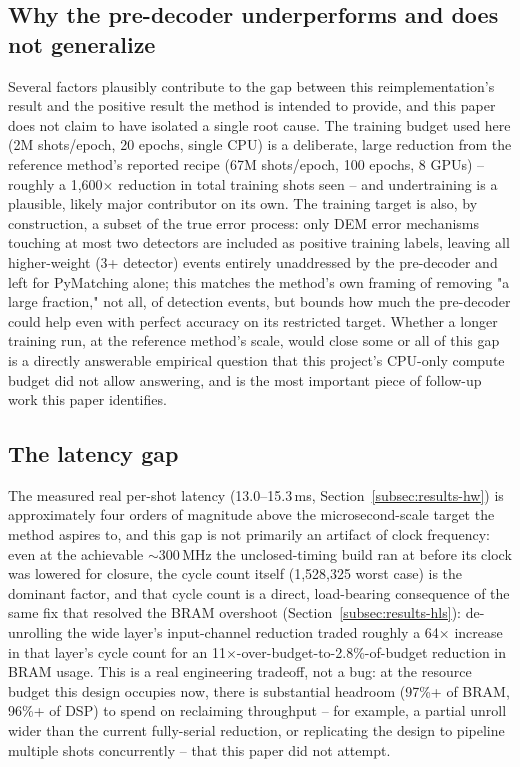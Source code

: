 \documentclass[conference]{IEEEtran}
\begin{document}
\subsection{Why the pre-decoder underperforms and does not generalize}
\label{subsec:discussion-why}
Several factors plausibly contribute to the gap between this reimplementation's result and the positive result the method is intended to provide, and this paper does not claim to have isolated a single root cause. The training budget used here (2M shots/epoch, 20 epochs, single CPU) is a deliberate, large reduction from the reference method's reported recipe (67M shots/epoch, 100 epochs, 8 GPUs) -- roughly a 1{,}600\(\times\) reduction in total training shots seen -- and undertraining is a plausible, likely major contributor on its own. The training target is also, by construction, a subset of the true error process: only DEM error mechanisms touching at most two detectors are included as positive training labels, leaving all higher-weight (3+ detector) events entirely unaddressed by the pre-decoder and left for PyMatching alone; this matches the method's own framing of removing "a large fraction," not all, of detection events, but bounds how much the pre-decoder could help even with perfect accuracy on its restricted target. Whether a longer training run, at the reference method's scale, would close some or all of this gap is a directly answerable empirical question that this project's CPU-only compute budget did not allow answering, and is the most important piece of follow-up work this paper identifies.

\subsection{The latency gap}
\label{subsec:discussion-latency}
The measured real per-shot latency (13.0--15.3\,ms, Section~\ref{subsec:results-hw}) is approximately four orders of magnitude above the microsecond-scale target the method aspires to, and this gap is not primarily an artifact of clock frequency: even at the achievable \(\sim\)300\,MHz the unclosed-timing build ran at before its clock was lowered for closure, the cycle count itself (1{,}528{,}325 worst case) is the dominant factor, and that cycle count is a direct, load-bearing consequence of the same fix that resolved the BRAM overshoot (Section~\ref{subsec:results-hls}): de-unrolling the wide layer's input-channel reduction traded roughly a 64\(\times\) increase in that layer's cycle count for an 11\(\times\)-over-budget-to-2.8\%-of-budget reduction in BRAM usage. This is a real engineering tradeoff, not a bug: at the resource budget this design occupies now, there is substantial headroom (97\%+ of BRAM, 96\%+ of DSP) to spend on reclaiming throughput -- for example, a partial unroll wider than the current fully-serial reduction, or replicating the design to pipeline multiple shots concurrently -- that this paper did not attempt.
\end{document}
